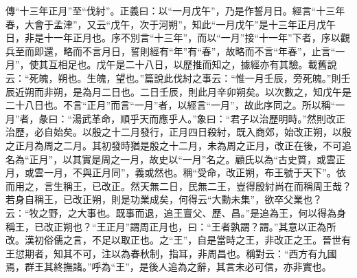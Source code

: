 {\noindent\zhuan{}\fzbyks 傳“十三年正月”至“伐紂”。正義曰：以“一月戊午”，乃是作誓月日。經言“十三年春，大會于孟津”，又云“戊午，次于河朔”，知此“一月戊午”是十三年正月戊午日，非是十一年正月也。序不別言“十三年”，而以“一月”接“十一年”下者，序以觀兵至而即還，略而不言月日，誓則經有“年”有“春”，故略而不言“年春”，止言“一月”，使其互相足也。戊午是二十八日，以歷推而知之，據經亦有其驗。載舊說云：“死魄，朔也。生魄，望也。”篇說此伐紂之事云：“惟一月壬辰，旁死魄。”則壬辰近朔而非朔，是為月二日也。二日壬辰，則此月辛卯朔矣。以次數之，知戊午是二十八日也。不言“正月”而言“一月”者，以經言“一月”，故此序同之。所以稱“一月”者，彖曰：“湯武革命，順乎天而應乎人。”象曰：“君子以治歷明時。”然則改正治歷，必自始矣。以殷之十二月發行，正月四日殺紂，既入商郊，始改正朔，以殷之正月為周之二月。其初發時猶是殷之十二月，未為周之正月，改正在後，不可追名為“正月”，以其實是周之一月，故史以“一月”名之。顧氏以為“古史質，或雲正月，或雲一月，不與正月同”，義或然也。稱“受命，改正朔，布王號于天下”。依而用之，言生稱王，已改正。然天無二日，民無二王，豈得殷紂尚在而稱周王哉？若身自稱王，已改正朔，則是功業成矣，何得云“大勳未集”，欲卒父業也？云：“牧之野，之大事也。既事而退，追王亶父、歷、昌。”是追為王，何以得為身稱王，已改正朔也？“王正月”謂周正月也，曰：“王者孰謂？謂。”其意以正為所改。漢初俗儒之言，不足以取正也。之“王”，自是當時之王，非改正之王。晉世有王愆期者，知其不可，注以為春秋制，指耳，非周昌也。稱對云：“西方有九國焉，群王其終撫諸。”呼為“王”，是後人追為之辭，其言未必可信，亦非實也。 \par}

